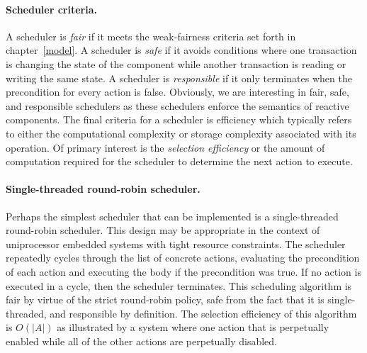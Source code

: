 \paragraph{Scheduler criteria.}
A scheduler is \emph{fair} if it meets the weak-fairness criteria set forth in chapter~\ref{model}.
A scheduler is \emph{safe} if it avoids conditions where one transaction is changing the state of the component while another transaction is reading or writing the same state.
A scheduler is \emph{responsible} if it only terminates when the precondition for every action is false.
Obviously, we are interesting in fair, safe, and responsible schedulers as these schedulers enforce the semantics of reactive components.
The final criteria for a scheduler is efficiency which typically refers to either the computational complexity or storage complexity associated with its operation.
Of primary interest is the \emph{selection efficiency} or the amount of computation required for the scheduler to determine the next action to execute.

\paragraph{Single-threaded round-robin scheduler.}
Perhaps the simplest scheduler that can be implemented is a single-threaded round-robin scheduler.
This design may be appropriate in the context of uniprocessor embedded systems with tight resource constraints.
The scheduler repeatedly cycles through the list of concrete actions, evaluating the precondition of each action and executing the body if the precondition was true.
If no action is executed in a cycle, then the scheduler terminates.
This scheduling algorithm is fair by virtue of the strict round-robin policy, safe from the fact that it is single-threaded, and responsible by definition.
The selection efficiency of this algorithm is $O(|A|)$ as illustrated by a system where one action that is perpetually enabled while all of the other actions are perpetually disabled.

